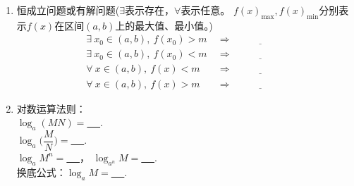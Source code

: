 \documentclass{article}
\newif\ifte
\newcommand{\q}{\quad}
\begin{document}
\begin{multicols}{2}
\begin{enumerate}[leftmargin=20pt]
\item 恒成立问题或有解问题($ \exists $表示存在，$ \forall $表示任意。
$ f(x)_{\max},f(x)_{\min} $分别表示$ f(x) $在区间$ (a,b) $上的最大值、最小值。)
\begin{align*}
    \exists\ x_0\in(a,b),\ f(x_0)>m &\ \Rightarrow \ 
    \underline{\ \ifte f(x)_{\max} >m\else \hspace{2cm} \fi\ }\\
    \exists\ x_0\in(a,b),\ f(x_0)<m &\ \Rightarrow \ 
    \underline{\ \ifte f(x)_{\min} <m\else \hspace{2cm} \fi\ }\\
    \forall\ x\in(a,b),\ f(x)<m &\ \Rightarrow \ 
    \underline{\ \ifte f(x)_{\max} <m\else \hspace{2cm} \fi\ }\\
    \forall\ x\in(a,b),\ f(x)>m &\ \Rightarrow \ 
    \underline{\ \ifte f(x)_{\min} >m\else \hspace{2cm} \fi\ }
\end{align*}

\item 对数运算法则：\\ $ \log_a (MN)= $\underline{\ \ifte 
    $ \log_a M+\log_a N $ \else \hspace{2cm} \fi\ }. \\
$ \log_a \Big(\dfrac{M}{N}\Big)= $\underline{\ \ifte 
    $ \log_a M-\log_a N $ \else \hspace{2cm} \fi\ }. \\
$ \log_a M^n= $\underline{\ \ifte 
    $ n\log_a M $ \else \hspace{1.5cm} \fi\ }，\q 
$ \log_{a^n} M= $\underline{\ \ifte 
    $ \dfrac{1}{n}\log_a M $ \else \hspace{1.5cm} \fi\ }. \\
换底公式：$ \log_a M= $\underline{\ \ifte 
    $ \dfrac{\log_b M}{\log_b a} $ \else \hspace{2cm} \fi\ }.


\end{enumerate}
\end{multicols}
\end{document}
